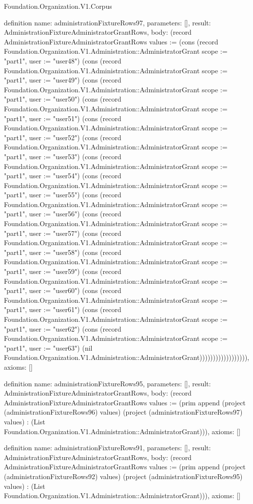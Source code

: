 \begin{lexlean}{Foundation.Organization.V1.Corpus}
\begin{semanticmodule}
definition{
  name: administrationFixtureRows97,
  parameters: [],
  result: AdministrationFixtureAdministratorGrantRows,
  body: (record AdministrationFixtureAdministratorGrantRows {values := (cons (record Foundation.Organization.V1.Administration::AdministratorGrant {scope := "part1", user := "user48"}) (cons (record Foundation.Organization.V1.Administration::AdministratorGrant {scope := "part1", user := "user49"}) (cons (record Foundation.Organization.V1.Administration::AdministratorGrant {scope := "part1", user := "user50"}) (cons (record Foundation.Organization.V1.Administration::AdministratorGrant {scope := "part1", user := "user51"}) (cons (record Foundation.Organization.V1.Administration::AdministratorGrant {scope := "part1", user := "user52"}) (cons (record Foundation.Organization.V1.Administration::AdministratorGrant {scope := "part1", user := "user53"}) (cons (record Foundation.Organization.V1.Administration::AdministratorGrant {scope := "part1", user := "user54"}) (cons (record Foundation.Organization.V1.Administration::AdministratorGrant {scope := "part1", user := "user55"}) (cons (record Foundation.Organization.V1.Administration::AdministratorGrant {scope := "part1", user := "user56"}) (cons (record Foundation.Organization.V1.Administration::AdministratorGrant {scope := "part1", user := "user57"}) (cons (record Foundation.Organization.V1.Administration::AdministratorGrant {scope := "part1", user := "user58"}) (cons (record Foundation.Organization.V1.Administration::AdministratorGrant {scope := "part1", user := "user59"}) (cons (record Foundation.Organization.V1.Administration::AdministratorGrant {scope := "part1", user := "user60"}) (cons (record Foundation.Organization.V1.Administration::AdministratorGrant {scope := "part1", user := "user61"}) (cons (record Foundation.Organization.V1.Administration::AdministratorGrant {scope := "part1", user := "user62"}) (cons (record Foundation.Organization.V1.Administration::AdministratorGrant {scope := "part1", user := "user63"}) (nil Foundation.Organization.V1.Administration::AdministratorGrant)))))))))))))))))}),
  axioms: []
}

definition{
  name: administrationFixtureRows95,
  parameters: [],
  result: AdministrationFixtureAdministratorGrantRows,
  body: (record AdministrationFixtureAdministratorGrantRows {values := (prim append (project (administrationFixtureRows96) values) (project (administrationFixtureRows97) values) : (List Foundation.Organization.V1.Administration::AdministratorGrant))}),
  axioms: []
}

definition{
  name: administrationFixtureRows91,
  parameters: [],
  result: AdministrationFixtureAdministratorGrantRows,
  body: (record AdministrationFixtureAdministratorGrantRows {values := (prim append (project (administrationFixtureRows92) values) (project (administrationFixtureRows95) values) : (List Foundation.Organization.V1.Administration::AdministratorGrant))}),
  axioms: []
}


\end{semanticmodule}
\end{lexlean}
